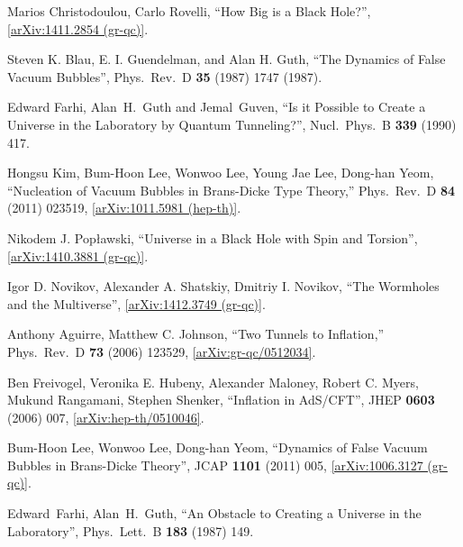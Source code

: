 \documentclass[12pt]{article}
\newcommand{\2}{$^2$}
\newcommand{\3}{$^3$}
\newcommand{\4}{$_4$}
\newcommand{\5}{$_5$}
\begin{document}
\begin{thebibliography}{400}
Marios Christodoulou, Carlo Rovelli, ``How Big is a Black Hole?'', \href{http://arxiv.org/abs/1411.2854}{[arXiv:1411.2854 (gr-qc)]}. 

Steven K. Blau, E. I. Guendelman, and Alan H. Guth,
  ``The Dynamics of False Vacuum Bubbles'',
  Phys.\ Rev.\ D {\bf 35} (1987) 1747 (1987).

  Edward Farhi, Alan~H.~Guth and Jemal~Guven,
  ``Is it Possible to Create a Universe in the Laboratory by Quantum Tunneling?'',
  Nucl.\ Phys.\  B {\bf 339} (1990) 417.
	

  Hongsu Kim, Bum-Hoon Lee, Wonwoo Lee, Young Jae Lee, Dong-han Yeom,
  ``Nucleation of Vacuum Bubbles in Brans-Dicke Type Theory,''
  Phys.\ Rev.\ D {\bf 84} (2011) 023519, \href{http://arxiv.org/abs/1011.5981}{[arXiv:1011.5981 (hep-th)]}.
	
Nikodem J. Pop{\l}awski, ``Universe in a Black Hole with Spin and Torsion'', \href{http://arxiv.org/abs/1410.3881}{[arXiv:1410.3881 (gr-qc)]}.

Igor D. Novikov, Alexander A. Shatskiy,  Dmitriy I. Novikov, ``The Wormholes and the Multiverse'', \href{http://arxiv.org/abs/1412.3749}{[arXiv:1412.3749 (gr-qc)]}.


  Anthony Aguirre, Matthew C. Johnson,
  ``Two Tunnels to Inflation,''
  Phys.\ Rev.\ D {\bf 73} (2006) 123529, \href{http://arxiv.org/abs/gr-qc/0512034}{[arXiv:gr-qc/0512034]}.

  Ben Freivogel, Veronika E. Hubeny, Alexander Maloney, Robert C. Myers, Mukund Rangamani, Stephen Shenker,
  ``Inflation in AdS/CFT'',
  JHEP {\bf 0603} (2006) 007,
  \href{http://arxiv.org/abs/hep-th/0510046}{[arXiv:hep-th/0510046]}.

  Bum-Hoon Lee, Wonwoo Lee, Dong-han Yeom,
  ``Dynamics of False Vacuum Bubbles in Brans-Dicke Theory'',
  JCAP {\bf 1101} (2011) 005,
 \href{http://arxiv.org/abs/1006.3127}{[arXiv:1006.3127 (gr-qc)]}.

  Edward~Farhi, Alan~H.~Guth,
  ``An Obstacle to Creating a Universe in the Laboratory'',
  Phys.\ Lett.\ B {\bf 183} (1987) 149.


\end{thebibliography}
\end{document}
